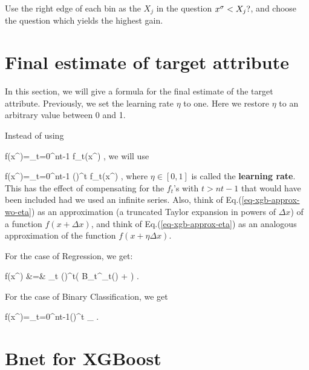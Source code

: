 Use the right edge 
of each bin as the $X_j$ in the question 
 $x^\sigma<X_j?$,
and choose the question which
yields the highest gain.


 


\section{Final estimate of
target attribute}

In this section,
we will
give a formula for the 
final estimate
of the target attribute.
Previously, we set
the learning rate $\eta$ to one.
Here we restore $\eta$
to an arbitrary value 
between 0 and 1.

Instead of using 

\beq
f(x^\s)=\sum_{t=0}^{nt-1} f_t(x^\s)
\;,
\label{eq-xgb-approx-wo-eta}
\eeq
we will use 

\beq
f(x^\s)=\sum_{t=0}^{nt-1} 
 (\eta)^t f_t(x^\s)
\;,
\label{eq-xgb-approx-eta}
\eeq
where $\eta\in [0,1]$ is called 
the {\bf learning rate}.
This has the effect
of compensating for the $f_t$'s
with $t>nt-1$ that would
 have been included
had we used an infinite series.
Also, think of Eq.(\ref{eq-xgb-approx-wo-eta})
as
an approximation  (a truncated Taylor
expansion in powers
of $\Delta x$) of a function $f(x+\Delta x)$,
and think of Eq.(\ref{eq-xgb-approx-eta})
as an analogous approximation of the function 
$f(x+\eta \Delta x)$.

For the case of Regression, we get:

\beqa
f(x^\s)
&=&
\sum_t (\eta)^t\left(
{B_t^{\ell_t(\s)} + \lam}
\right)
\;.
\eeqa

For the case of Binary Classification,
 we get

\beq
f(x^\s)=\sum_{t=0}^{nt-1}(\eta)^t
_{}
\;.
\eeq

\section{Bnet for XGBoost}




